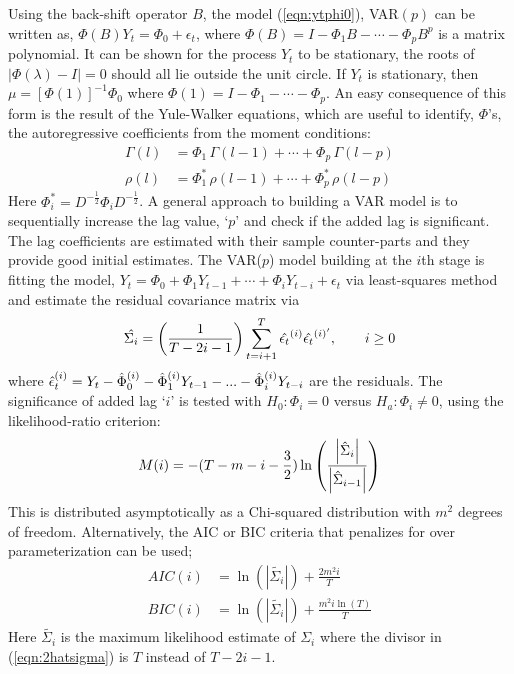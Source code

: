 Using the back-shift operator $B$, the model (\ref{eqn:ytphi0}), VAR$(p)$ can be written as, $ \Phi(B)Y_t=\Phi_0+\epsilon_t$, where $\Phi(B)=I-\Phi_1B-\cdots-\Phi_pB^p$ is a matrix polynomial. It can be shown for the process $Y_t$ to be stationary, the roots of $\left| \Phi(\lambda)-I \right|=0$ should all lie outside the unit circle. If $Y_t$ is stationary, then $\mu=[\Phi(1)]^{-1}\Phi_0$ where $\Phi(1)=I-\Phi_1-\cdots-\Phi_p$. An easy consequence of this form is the result of the Yule-Walker equations, which are useful to identify, $\Phi$'s, the autoregressive coefficients from the moment conditions:
	\begin{equation}\label{eqn:2gammarho}
	\begin{split}
	\Gamma(l)&= \Phi_1 \,\Gamma(l-1) +\cdots + \Phi_p\, \Gamma(l-p) \\
	\rho(l)&= \Phi_1^* \,\rho(l-1) + \cdots + \Phi_p^* \, \rho(l-p) 
	\end{split}
	\end{equation}
Here $\Phi_i^*=D^{-\frac{1}{2}}\Phi_iD^{-\frac{1}{2}}$. A general approach to building a VAR model is to sequentially increase the lag value, `$p$' and check if the added lag is significant. The lag coefficients are estimated with their sample counter-parts and they provide good initial estimates. The VAR($p$) model building at the $i$th stage is fitting the model, $Y_t=\Phi_0+\Phi_1Y_{t-1}+\cdots+\Phi_iY_{t-i}+\epsilon_t$ via least-squares method and estimate the residual covariance matrix via
	\begin{equation}\label{eqn:2hatsigma}
	\hat{\Sigma_i} = \left(\frac{1}{T-2i-1} \right) \sum_{t=i+1}^{T}\Hat{\epsilon_t}^{(i)}{{\hat{\epsilon_t}^{(i)^\prime}}}, \qquad i \geq 0
	\end{equation}
where $ \Hat{\epsilon}_t^{(i)}=Y_t-\Hat{\Phi}_0^{(i)}-\Hat{\Phi}_1^{(i)}Y_{t-1}-...-\Hat{\Phi}_i^{(i)}Y_{t-i}$ are the residuals. The significance of added lag `$i$' is tested with $H_0: \Phi_i=0$ versus $H_a: \Phi_i \neq 0$, using the likelihood-ratio criterion:
	\begin{equation}\label{eqn:2mi}
	M(i)= -(T-m-i-\frac{3}{2}) \ln\left(\frac{\left| \Hat{\Sigma}_i \right|}{\left| \Hat{\Sigma}_{i-1} \right|}\right)
	\end{equation}
This is distributed asymptotically as a Chi-squared distribution with $m^2$ degrees of freedom. Alternatively, the AIC or BIC criteria that penalizes for over parameterization can be used; 
	\begin{equation}\label{eqn:2aicbic}
	\begin{split}
	AIC(i)&= \ln\left(\left| \tilde{\Sigma_i} \right|\right)+\frac{2m^2i}{T} \\
	BIC(i)&= \ln\left(\left| \tilde{\Sigma_i} \right|\right)+\frac{m^2i \ln(T)}{T}
	\end{split}
	\end{equation}
Here $\tilde{\Sigma_i}$ is the maximum likelihood estimate of $\Sigma_i$ where the divisor in (\ref{eqn:2hatsigma}) is $T$ instead of $T - 2i - 1$.

